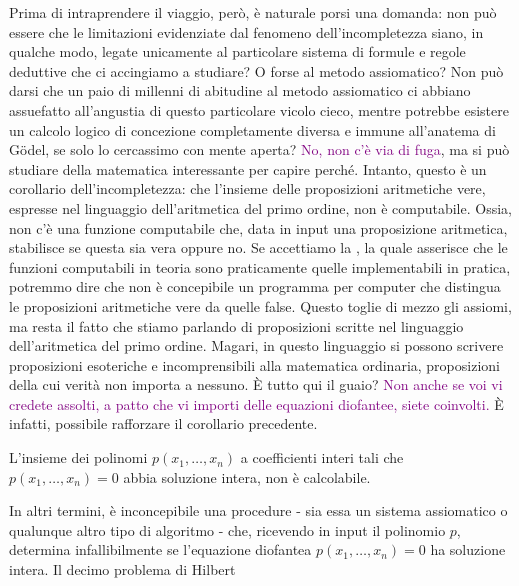 Prima di intraprendere il viaggio, però, è naturale porsi una domanda: non può essere che le limitazioni evidenziate dal fenomeno dell'incompletezza siano, in qualche modo, legate unicamente al particolare sistema di formule e regole deduttive che ci accingiamo a studiare? O forse al metodo assiomatico? Non può darsi che un paio di millenni di abitudine al metodo assiomatico ci abbiano 
assuefatto all'angustia di questo particolare vicolo cieco, mentre potrebbe esistere un calcolo logico di concezione completamente diversa e immune all'anatema di Gödel, se solo lo cercassimo con mente aperta? \textcolor{purple}{No, non c'è via di fuga}, 
ma si può studiare della matematica interessante per capire perché. Intanto, questo è un corollario dell'incompletezza: che l'insieme delle proposizioni aritmetiche vere, espresse nel linguaggio dell'aritmetica del primo ordine, non è computabile. Ossia, non c'è una funzione computabile che, data in input una proposizione 
aritmetica, stabilisce se questa sia vera oppure no. Se accettiamo la , la quale asserisce che le funzioni computabili in teoria sono praticamente quelle implementabili in pratica, potremmo dire che non è concepibile un programma per computer che distingua le proposizioni aritmetiche vere da quelle false.
Questo toglie di mezzo gli assiomi, ma resta il fatto che stiamo parlando di proposizioni scritte nel linguaggio dell'aritmetica del primo ordine. Magari, in questo linguaggio si possono scrivere proposizioni esoteriche e incomprensibili alla matematica ordinaria, proposizioni della cui verità non importa a nessuno. È tutto qui il guaio?
\textcolor{purple}{Non anche se voi vi credete assolti, a patto che vi importi delle equazioni diofantee, siete coinvolti.} È infatti, possibile rafforzare il corollario precedente.

\begin{theorem}
    L'insieme dei polinomi $p(x_1,\dots,x_n)$ a coefficienti interi tali che $p(x_1,\dots,x_n) = 0$ abbia soluzione intera, non è calcolabile.
\end{theorem}

In altri termini, è inconcepibile una procedure - sia essa un sistema assiomatico o qualunque altro tipo di algoritmo - che, ricevendo in input il polinomio $p$, determina infallibilmente se l'equazione diofantea $p(x_1,\dots,x_n) = 0$ ha soluzione intera.
Il decimo problema di Hilbert

